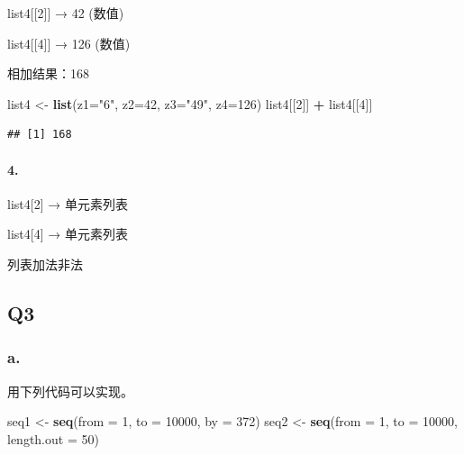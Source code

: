 \documentclass[
]{article}
\newenvironment{Shaded}{\begin{snugshade}}{\end{snugshade}}
\newcommand{\AttributeTok}[1]{\textcolor[rgb]{0.13,0.29,0.53}{#1}}
\newcommand{\DecValTok}[1]{\textcolor[rgb]{0.00,0.00,0.81}{#1}}
\newcommand{\FunctionTok}[1]{\textcolor[rgb]{0.13,0.29,0.53}{\textbf{#1}}}
\newcommand{\NormalTok}[1]{#1}
\newcommand{\OtherTok}[1]{\textcolor[rgb]{0.56,0.35,0.01}{#1}}
\newcommand{\SpecialCharTok}[1]{\textcolor[rgb]{0.81,0.36,0.00}{\textbf{#1}}}
\newcommand{\StringTok}[1]{\textcolor[rgb]{0.31,0.60,0.02}{#1}}
\begin{document}
list4{[}{[}2{]}{]} → 42 (数值)

list4{[}{[}4{]}{]} → 126 (数值)

相加结果：168

\begin{Shaded}
\begin{Highlighting}[]
\NormalTok{list4 }\OtherTok{\textless{}{-}} \FunctionTok{list}\NormalTok{(}\AttributeTok{z1=}\StringTok{"6"}\NormalTok{, }\AttributeTok{z2=}\DecValTok{42}\NormalTok{, }\AttributeTok{z3=}\StringTok{"49"}\NormalTok{, }\AttributeTok{z4=}\DecValTok{126}\NormalTok{)}
\NormalTok{list4[[}\DecValTok{2}\NormalTok{]] }\SpecialCharTok{+}\NormalTok{ list4[[}\DecValTok{4}\NormalTok{]]  }
\end{Highlighting}
\end{Shaded}

\begin{verbatim}
## [1] 168
\end{verbatim}

\paragraph{4.}\label{section-3}

list4{[}2{]} → 单元素列表

list4{[}4{]} → 单元素列表

列表加法非法

\subsection{Q3}\label{q3}

\subsubsection{a.}\label{a.-2}

用下列代码可以实现。

\begin{Shaded}
\begin{Highlighting}[]
\NormalTok{seq1 }\OtherTok{\textless{}{-}} \FunctionTok{seq}\NormalTok{(}\AttributeTok{from =} \DecValTok{1}\NormalTok{, }\AttributeTok{to =} \DecValTok{10000}\NormalTok{, }\AttributeTok{by =} \DecValTok{372}\NormalTok{)}
\NormalTok{seq2 }\OtherTok{\textless{}{-}} \FunctionTok{seq}\NormalTok{(}\AttributeTok{from =} \DecValTok{1}\NormalTok{, }\AttributeTok{to =} \DecValTok{10000}\NormalTok{, }\AttributeTok{length.out =} \DecValTok{50}\NormalTok{)}
\end{Highlighting}
\end{Shaded}
\end{document}
